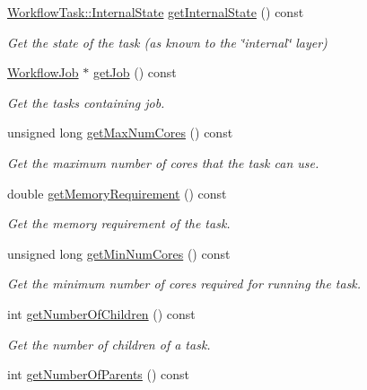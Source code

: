 \begin{DoxyCompactItemize}
\hyperlink{classwrench_1_1_workflow_task_aa2b860941b37263c26385fd076502e04}{Workflow\+Task\+::\+Internal\+State} \hyperlink{classwrench_1_1_workflow_task_a3b13bbd16eb3eefcbcbc6964613b70bc}{get\+Internal\+State} () const
\begin{DoxyCompactList}\small\item\em Get the state of the task (as known to the \char`\"{}internal\char`\"{} layer) \end{DoxyCompactList}\item 
\hyperlink{classwrench_1_1_workflow_job}{Workflow\+Job} $\ast$ \hyperlink{classwrench_1_1_workflow_task_aa49cf3afae40d6dcf7394cd94fd4918f}{get\+Job} () const
\begin{DoxyCompactList}\small\item\em Get the task\textquotesingle{}s containing job. \end{DoxyCompactList}\item 
unsigned long \hyperlink{classwrench_1_1_workflow_task_aa470fe4c0a34211165989afabcba795f}{get\+Max\+Num\+Cores} () const
\begin{DoxyCompactList}\small\item\em Get the maximum number of cores that the task can use. \end{DoxyCompactList}\item 
double \hyperlink{classwrench_1_1_workflow_task_aeafc6e6f0bce5853a3fd1e4818638908}{get\+Memory\+Requirement} () const
\begin{DoxyCompactList}\small\item\em Get the memory requirement of the task. \end{DoxyCompactList}\item 
unsigned long \hyperlink{classwrench_1_1_workflow_task_a05d06d1988745735016dcf19d38e2398}{get\+Min\+Num\+Cores} () const
\begin{DoxyCompactList}\small\item\em Get the minimum number of cores required for running the task. \end{DoxyCompactList}\item 
int \hyperlink{classwrench_1_1_workflow_task_a6d69d3c969a5cb32a3a53ec20fb6f6cb}{get\+Number\+Of\+Children} () const
\begin{DoxyCompactList}\small\item\em Get the number of children of a task. \end{DoxyCompactList}\item 
int \hyperlink{classwrench_1_1_workflow_task_ab0c0bc84347585a8ea8ca45251931304}{get\+Number\+Of\+Parents} () const

\end{DoxyCompactItemize}
